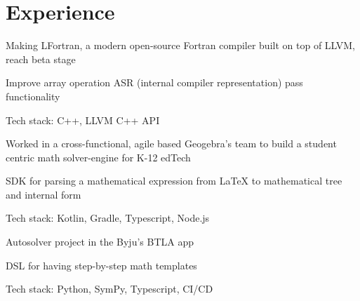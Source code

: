\documentclass[]{deedy-resume-openfont}
\begin{document}
\begin{minipage}[t]{0.66\textwidth}


\section{Experience}

\vspace{\topsep} %
\vspace{\topsep}
\begin{tightemize}
\item Making LFortran, a modern open-source Fortran compiler built on top of LLVM, reach beta stage
\item Improve array operation ASR (internal compiler representation) pass functionality
\item Tech stack: C++, LLVM C++ API
\end{tightemize}
\sectionsep

\vspace{\topsep} %
\begin{tightemize}
\item Worked in a cross-functional, agile based Geogebra's team to build a student centric math solver-engine for K-12 edTech
\item SDK for parsing a mathematical expression from LaTeX to mathematical tree and internal form
\item Tech stack: Kotlin, Gradle, Typescript, Node.js
\end{tightemize}
\sectionsep

\vspace{\topsep} %
\vspace{\topsep}
\begin{tightemize}
\item Autosolver project in the Byju's BTLA app
\item DSL for having step-by-step math templates
\item Tech stack: Python, SymPy, Typescript, CI/CD
\end{tightemize}
\sectionsep



\end{minipage}
\end{document}
